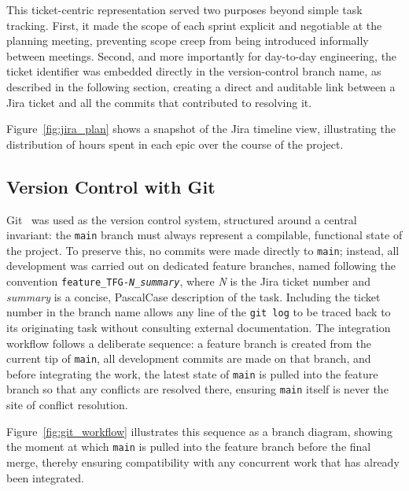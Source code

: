 \documentclass[english,bachelor]{tfgitic}[2026/01/22]
\begin{document}
This ticket-centric representation served two purposes beyond simple task tracking. First, it made the scope of each sprint explicit and negotiable at the planning meeting, preventing scope creep from being introduced informally between meetings. Second, and more importantly for day-to-day engineering, the ticket identifier was embedded directly in the version-control branch name, as described in the following section, creating a direct and auditable link between a Jira ticket and all the commits that contributed to resolving it.

Figure~\ref{fig:jira_plan} shows a snapshot of the Jira timeline view, illustrating the distribution of hours spent in each epic over the course of the project.


\subsection{Version Control with Git}

Git~\cite{chacon2014progit} was used as the version control system, structured around a central invariant: the \texttt{main} branch must always represent a compilable, functional state of the project. To preserve this, no commits were made directly to \texttt{main}; instead, all development was carried out on dedicated feature branches, named following the convention \texttt{feature\_TFG-\textit{N}\_\textit{summary}}, where \textit{N} is the Jira ticket number and \textit{summary} is a concise, PascalCase description of the task. Including the ticket number in the branch name allows any line of the \texttt{git log} to be traced back to its originating task without consulting external documentation. The integration workflow follows a deliberate sequence: a feature branch is created from the current tip of \texttt{main}, all development commits are made on that branch, and before integrating the work, the latest state of \texttt{main} is pulled into the feature branch so that any conflicts are resolved there, ensuring \texttt{main} itself is never the site of conflict resolution.

Figure~\ref{fig:git_workflow} illustrates this sequence as a branch diagram, showing the moment at which \texttt{main} is pulled into the feature branch before the final merge, thereby ensuring compatibility with any concurrent work that has already been integrated.
\end{document}
